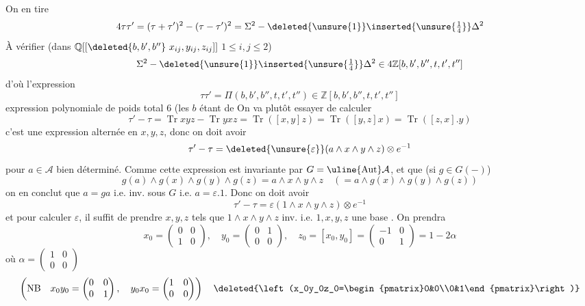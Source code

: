On en tire
\[
4\tau\tau'=(\tau+\tau')^2-(\tau-\tau')^2=\Sigma^2-\deleted{\unsure{1}}\inserted{\unsure{\tfrac14}}\Delta^2
\]
À vérifier (dans $\mathbb{Q}[[\deleted{b,b',b''}\ x_{ij},y_{ij},z_{ij}]]$ $1\leq i,j\leq2$)
\[
\Sigma^2-\deleted{\unsure{1}}\inserted{\unsure{\tfrac14}}\Delta^2\in4\mathbb{Z}[b,b',b'',t,t',t'']
\]
d'où l'expression
\[
\tau\tau'=\Pi(b,b',b'',t,t',t'')\in\mathbb{Z}[b,b',b'',t,t',t'']
\]
expression polynomiale de poids total $6$ (les $b$ étant de
On va plutôt essayer de calculer
\[
\tau'-\tau=\operatorname{Tr}xyz-\operatorname{Tr}yxz
=\operatorname{Tr}([x,y]z)=\operatorname{Tr}([y,z]x)=\operatorname{Tr}([z,x].y)
\]
c'est une expression  alternée en $x,y,z$, donc on doit avoir
\[
\tau'-\tau=\deleted{\unsure{\varepsilon}}(a\wedge x\wedge y\wedge z)\otimes e^{-1}
\]
pour $a\in\mathcal{A}$ bien déterminé. Comme cette expression est invariante par $G=\uline{\operatorname{Aut}}\mathcal{A}$,  et que (si $g\in G(-)$)
\[
g(a)\wedge g(x)\wedge g(y)\wedge g(z)=a\wedge x\wedge y\wedge z\quad(=a\wedge g(x)\wedge g(y)\wedge g(z))
\]
on en conclut que $a=ga$ i.e. inv. sous $G$ i.e. $a=\varepsilon.1$. Donc on doit avoir
\[
\tau'-\tau=\varepsilon(1\wedge x\wedge y\wedge z)\otimes e^{-1}
\]
et pour calculer $\varepsilon$, il suffit de prendre $x,y,z$ tels que $1\wedge x\wedge y\wedge z$ inv. i.e. $1,x,y,z$ une base . On prendra
\[
x_0=\begin{pmatrix}0&0\\1&0\end{pmatrix},\quad
y_0=\begin{pmatrix}0&1\\0&0\end{pmatrix},\quad
z_0=[x_0,y_0]=\begin{pmatrix}-1&0\\0&1\end{pmatrix}=1-2\alpha
\]
où $\alpha=\begin{pmatrix}1&0\\0&0\end{pmatrix}$
\[
\left(\mathrm{NB}\quad x_0y_0=\begin{pmatrix}0&0\\0&1\end{pmatrix},\quad y_0x_0=\begin{pmatrix}1&0\\0&0\end{pmatrix}\right)
\quad\deleted{\left(x_0y_0z_0=\begin{pmatrix}0&0\\0&1\end{pmatrix}\right)}
\]
